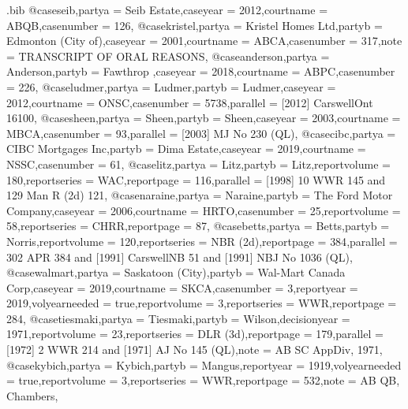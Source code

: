 \begin{filecontents*}[overwrite]{\jobname.bib}
@case{seib,partya = {Seib Estate},caseyear = {2012},courtname = {ABQB},casenumber = {126},}
@case{kristel,partya = {Kristel Homes Ltd},partyb = {Edmonton (City of)},caseyear = {2001},courtname = {ABCA},casenumber = {317},note = {TRANSCRIPT OF ORAL REASONS},}
@case{anderson,partya = {Anderson},partyb = {Fawthrop },caseyear = {2018},courtname = {ABPC},casenumber = {226},}
@case{ludmer,partya = {Ludmer},partyb = {Ludmer},caseyear = {2012},courtname = {ONSC},casenumber = {5738},parallel = {[2012] CarswellOnt 16100},}
@case{sheen,partya = {Sheen},partyb = {Sheen},caseyear = {2003},courtname = {MBCA},casenumber = {93},parallel = {[2003] MJ No 230 (QL)},}
@case{cibc,partya = {CIBC Mortgages Inc},partyb = {Dima Estate},caseyear = {2019},courtname = {NSSC},casenumber = {61},}
@case{litz,partya = {Litz},partyb = {Litz},reportvolume = {180},reportseries = {WAC},reportpage = {116},parallel = {[1998] 10 WWR 145 and 129 Man R (2d) 121},}
@case{naraine,partya = {Naraine},partyb = {The Ford Motor Company},caseyear = {2006},courtname = {HRTO},casenumber = {25},reportvolume = {58},reportseries = {CHRR},reportpage = {87},}
@case{betts,partya = {Betts},partyb = {Norris},reportvolume = {120},reportseries = {NBR (2d)},reportpage = {384},parallel = {302 APR 384 and [1991] CarswellNB 51 and [1991] NBJ No 1036 (QL)},}
@case{walmart,partya = {Saskatoon (City)},partyb = {Wal-Mart Canada Corp},caseyear = {2019},courtname = {SKCA},casenumber = {3},reportyear = {2019},volyearneeded = {true},reportvolume = {3},reportseries = {WWR},reportpage = {284},}
@case{tiesmaki,partya = {Tiesmaki},partyb = {Wilson},decisionyear = {1971},reportvolume = {23},reportseries = {DLR (3d)},reportpage = {179},parallel = {[1972] 2 WWR 214 and [1971] AJ No 145 (QL)},note = {AB SC AppDiv, 1971},}
@case{kybich,partya = {Kybich},partyb = {Mangus},reportyear = {1919},volyearneeded = {true},reportvolume = {3},reportseries = {WWR},reportpage = {532},note = {AB QB, Chambers},}


\end{filecontents*}
